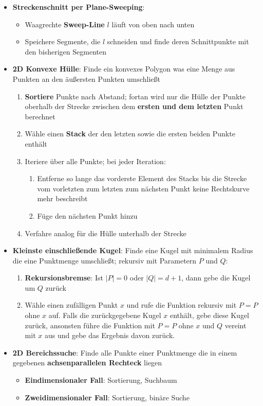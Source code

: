 \documentclass[10pt,a4paper]{article}
\begin{document}
	\begin{itemize}
		\item \textbf{Streckenschnitt per Plane-Sweeping}:
		\begin{itemize}
			\item Waagrechte \textbf{Sweep-Line} $l$ läuft von oben nach unten
			\item Speichere Segmente, die $l$ schneiden und finde deren Schnittpunkte mit den bisherigen Segmenten
		\end{itemize}
		\item \textbf{2D Konvexe Hülle}: Finde ein konvexes Polygon was eine Menge aus Punkten an den äußersten Punkten umschließt
		\begin{enumerate}
			\item \textbf{Sortiere} Punkte nach Abstand; fortan wird nur die Hülle der Punkte oberhalb der Strecke zwischen dem \textbf{ersten und dem letzten} Punkt berechnet
			\item Wähle einen \textbf{Stack} der den letzten sowie die ersten beiden Punkte enthält
			\item Iteriere über alle Punkte; bei jeder Iteration:
			\begin{enumerate}
				\item Entferne so lange das vorderste Element des Stacks bis die Strecke vom vorletzten zum letzten zum nächsten Punkt keine Rechtskurve mehr beschreibt
				\item Füge den nächsten Punkt hinzu
			\end{enumerate}
			\item Verfahre analog für die Hülle unterhalb der Strecke
		\end{enumerate}
		\item \textbf{Kleinste einschließende Kugel}: Finde eine Kugel mit minimalem Radius die eine Punktmenge umschließt; rekursiv mit Parametern $P$ und $Q$:
		\begin{enumerate}
			\item \textbf{Rekursionsbremse}: Ist $|P| = 0$ oder $|Q| = d + 1$, dann gebe die Kugel um $Q$ zurück
			\item Wähle einen zufälligen Punkt $x$ und rufe die Funktion rekursiv mit $P = P$ ohne $x$ auf. Falls die zurückgegebene Kugel $x$ enthält, gebe diese Kugel zurück, ansonsten führe die Funktion mit $P = P$ ohne $x$ und $Q$ vereint mit $x$ aus und gebe das Ergebnis davon zurück.
		\end{enumerate}
		\item \textbf{2D Bereichssuche}: Finde alle Punkte einer Punktmenge die in einem gegebenen \textbf{achsenparallelen Rechteck} liegen
		\begin{itemize}
			\item \textbf{Eindimensionaler Fall}: Sortierung, Suchbaum
			\item \textbf{Zweidimensionaler Fall}: Sortierung, binäre Suche
		\end{itemize}
	\end{itemize}
\end{document}
